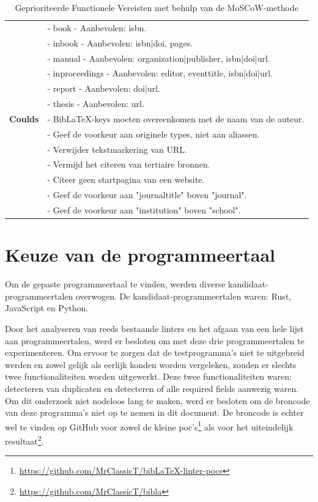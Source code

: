 \begin{table}[ht]
\begin{tabular}{p{2.5cm} p{13cm}}
        & - book - Aanbevolen: isbn. \\
        & - inbook - Aanbevolen: isbn|doi, pages. \\
        & - manual - Aanbevolen: organization|publisher, isbn|doi|url. \\
        & - inproceedings - Aanbevolen: editor, eventtitle, isbn|doi|url. \\
        & - report - Aanbevolen: doi|url. \\
        & - thesis - Aanbevolen: url. \\
        \midrule
        \textbf{Coulds} & 
          - BibLaTeX-keys moeten overeenkomen met de naam van de auteur. \\
        & - Geef de voorkeur aan originele types, niet aan aliassen. \\
        & - Verwijder tekstmarkering van URL. \\
        & - Vermijd het citeren van tertiaire bronnen. \\
        & - Citeer geen startpagina van een website. \\
        & - Geef de voorkeur aan "journaltitle" boven "journal". \\
        & - Geef de voorkeur aan "institution" boven "school". \\
        \bottomrule
    \end{tabular}
    \caption{Geprioriteerde Functionele Vereisten met behulp van de MoSCoW-methode}
    \label{tab:functional_requirements}
    \end{table}


\section{Keuze van de programmeertaal}
Om de gepaste programmeertaal te vinden, werden diverse kandidaat-programmeertalen overwogen. De kandidaat-programmeertalen waren: Rust, JavaScript en Python.

Door het analyseren van reeds bestaande linters en het afgaan van een hele lijst aan programmeertalen, werd er besloten om met deze drie programmeertalen te experimenteren. Om ervoor te zorgen dat de testprogramma's niet te uitgebreid werden en zowel gelijk als eerlijk konden worden vergeleken, zouden er slechts twee functionaliteiten worden uitgewerkt. Deze twee functionaliteiten waren: detecteren van duplicaten en detecteren of alle required fields aanwezig waren. Om dit onderzoek niet nodeloos lang te maken, werd er besloten om de broncode van deze programma's niet op te nemen in dit document. De broncode is echter wel te vinden op GitHub voor zowel de kleine poc's\footnote{\url{https://github.com/MrClassicT/bibLaTeX-linter-pocs}} als voor het uiteindelijk resultaat\footnote{\url{https://github.com/MrClassicT/bibla}}.

